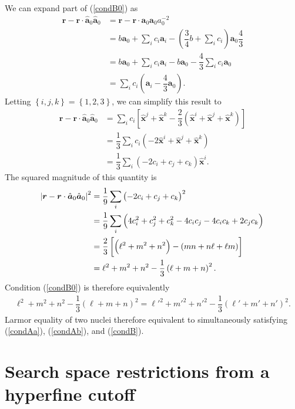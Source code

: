 \documentclass[11pt]{article}
\newcommand{\f}[2]{\dfrac{#1}{#2}} %
\newcommand{\p}[1]{\left(#1\right)} %
\renewcommand{\sp}[1]{\left[#1\right]} %
\renewcommand{\set}[1]{\left\{#1\right\}} %
\renewcommand{\v}{\bm} %
\newcommand{\uv}[1]{\hat{\v{#1}}} %
\renewcommand{\c}{\cdot} %
\renewcommand{\l}{\ell} %
\begin{document}
We can expand part of (\ref{condB0}) as
\begin{align}
  \v r-\v r\c\uv a_0\uv a_0
  &=\v r-\v r\c\v a_0\v a_0a_0^{-2} \\
  &=b\v a_0+\sum_ic_i\v a_i-\p{\f34b+\sum_ic_i}\v a_0\f43 \\
  &=b\v a_0+\sum_ic_i\v a_i-b\v a_0-\f43\sum_ic_i\v a_0 \\
  &=\sum_ic_i\p{\v a_i-\f43\v a_0}.
\end{align}
Letting $\set{i,j,k}=\set{1,2,3}$, we can simplify this result to
\begin{align}
  \v r-\v r\c\uv a_0\uv a_0
  &=\sum_ic_i\sp{\uv x^j+\uv x^k-\f23\p{\uv x^i+\uv x^j+\uv x^k}} \\
  &=\f13\sum_ic_i\p{-2\uv x^i+\uv x^j+\uv x^k} \\
  &=\f13\sum_i\p{-2c_i+c_j+c_k}\uv x^i.
\end{align}
The squared magnitude of this quantity is
\begin{align}
  \abs{\v r-\v r\c\uv a_0\uv a_0}^2
  &=\f19\sum_i\p{-2c_i+c_j+c_k}^2 \\
  &=\f19\sum_i\p{4c_i^2+c_j^2+c_k^2-4c_ic_j-4c_ic_k+2c_jc_k} \\
  &=\f23\sp{\p{\l^2+m^2+n^2}-\p{mn+n\l+\l m}} \\
  &=\l^2+m^2+n^2-\f13\p{\l+m+n}^2.
\end{align}
Condition (\ref{condB0}) is therefore equivalently
\begin{align}
  \l^2+m^2+n^2-\f13\p{\l+m+n}^2
  ={\l'}^2+{m'}^2+{n'}^2-\f13\p{\l'+m'+n'}^2. \label{condB}
\end{align}
Larmor equality of two nuclei therefore equivalent to simultaneously
satisfying (\ref{condAa}), (\ref{condAb}), and (\ref{condB}).

\section*{Search space restrictions from a hyperfine cutoff}
\end{document}
